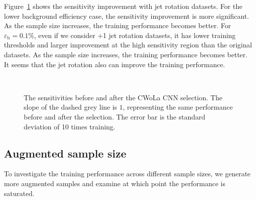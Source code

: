 \documentclass[12pt]{article}
\begin{document}
        Figure~\ref{fig:sensitivity_improvement_origin_jet_aug_1_3_5} shows the sensitivity improvement with jet rotation datasets. For the lower background efficiency case, the sensitivity improvement is more significant. As the sample size increases, the training performance becomes better. For $\varepsilon_{\text{b}} = 0.1 \%$, even if we consider +1 jet rotation datasets, it has lower training thresholds and larger improvement at the high sensitivity region than the original datasets. As the sample size increases, the training performance becomes better. It seems that the jet rotation also can improve the training performance.
        \begin{figure}[htpb]
            \centering
             \\
            \caption{The sensitivities before and after the CWoLa CNN selection. The slope of the dashed grey line is $1$, representing the same performance before and after the selection. The error bar is the standard deviation of 10 times training.}
            \label{fig:sensitivity_improvement_origin_jet_aug_1_3_5}
        \end{figure}
    \subsection{Augmented sample size}%
    \label{sub:augmented_sample_size}
        To investigate the training performance across different sample sizes, we generate more augmented samples and examine at which point the performance is saturated.
\end{document}
